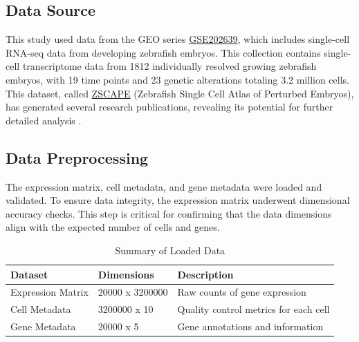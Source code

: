 \documentclass[runningheads]{llncs}
\begin{document}
\subsection*{Data Source}
This study used data from the GEO series \href{https://www.ncbi.nlm.nih.gov/geo/query/acc.cgi?acc=GSE202639}{GSE202639}, which includes single-cell RNA-seq data from developing zebrafish embryos. This collection contains single-cell transcriptome data from 1812 individually resolved growing zebrafish embryos, with 19 time points and 23 genetic alterations totaling 3.2 million cells. This dataset, called \href{https://cole-trapnell-lab.github.io/zscape/}{ZSCAPE} (Zebrafish Single Cell Atlas of Perturbed Embryos), has generated several research publications, revealing its potential for further detailed analysis \cite{saunders2023embryo,dorrity2023proteostasis}.

\subsection*{Data Preprocessing}
The expression matrix, cell metadata, and gene metadata were loaded and validated. To ensure data integrity, the expression matrix underwent dimensional accuracy checks. This step is critical for confirming that the data dimensions align with the expected number of cells and genes.

\begin{table}
    \centering
    \begin{tabular}{|l|l|l|}
        \hline
        \textbf{Dataset} & \textbf{Dimensions} & \textbf{Description} \\
        \hline
        Expression Matrix & 20000 x 3200000 & Raw counts of gene expression \\
        \hline
        Cell Metadata & 3200000 x 10 & Quality control metrics for each cell \\
        \hline
        Gene Metadata & 20000 x 5 & Gene annotations and information \\
        \hline
    \end{tabular}
    \caption{Summary of Loaded Data}
    \label{tab:my_label}
\end{table}
\end{document}
